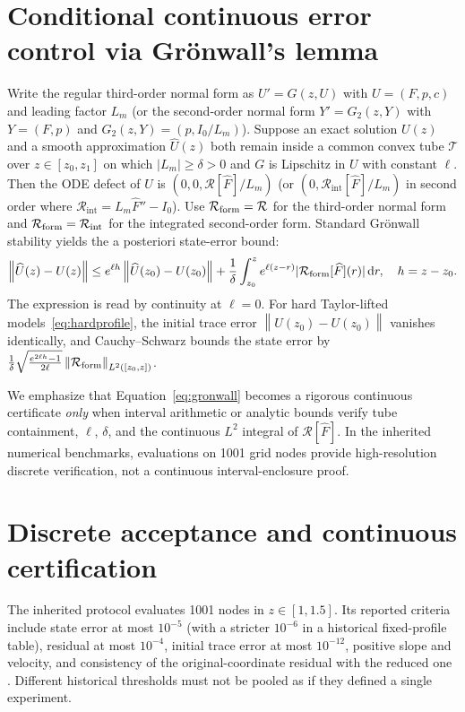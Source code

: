 \documentclass[11pt,a4paper,oneside]{report}
\numberwithin{equation}{chapter}
\newcommand{\R}{\mathcal R}
\newcommand{\dd}{\mathrm d}
\newcommand{\norm}[1]{\left\lVert#1\right\rVert}
\begin{document}
\section{Conditional continuous error control via Gr\"onwall's lemma}\label{sec:conditional-error}
Write the regular third-order normal form as $U'=G(z,U)$ with $U=(F,p,c)$ and leading factor $L_m$ (or the second-order normal form $Y'=G_2(z,Y)$ with $Y=(F,p)$ and $G_2(z,Y)=(p,I_0/L_m)$). Suppose an exact solution $U(z)$ and a smooth approximation $\widehat{U}(z)$ both remain inside a common convex tube $\mathcal{T}$ over $z\in[z_0,z_1]$ on which $|L_m|\ge \delta > 0$ and $G$ is Lipschitz in $U$ with constant $\ell$. Then the ODE defect of $\widehat{U}$ is $(0,0,\R[\widehat{F}]/L_m)$ (or $(0,\R_{\mathrm{int}}[\widehat{F}]/L_m)$ in second order where $\R_{\mathrm{int}}=L_m\widehat{F}''-I_0$). Use $\R_{\rm form}=\R$ for the third-order normal form and $\R_{\rm form}=\R_{\rm int}$ for the integrated second-order form. Standard Gr\"onwall stability \cite{teschl2012,mishra2023} yields the a posteriori state-error bound:
\begin{equation}\label{eq:gronwall}
\norm{\widehat U(z)-U(z)}\leq e^{\ell h}\norm{\widehat U(z_0)-U(z_0)}
 +\frac1\delta\int_{z_0}^{z}e^{\ell(z-r)}|\R_{\rm form}[\widehat F](r)|\,\dd r,
\quad h=z-z_0.
\end{equation}
The expression is read by continuity at $\ell=0$. For hard Taylor-lifted models~\eqref{eq:hardprofile}, the initial trace error $\norm{\widehat{U}(z_0)-U(z_0)}$ vanishes identically, and Cauchy--Schwarz bounds the state error by $\frac{1}{\delta}\sqrt{\frac{e^{2\ell h}-1}{2\ell}}\norm{\R_{\rm form}}_{L^2([z_0,z])}$.

We emphasize that Equation~\eqref{eq:gronwall} becomes a rigorous continuous certificate \emph{only} when interval arithmetic or analytic bounds verify tube containment, $\ell$, $\delta$, and the continuous $L^2$ integral of $\R[\widehat{F}]$. In the inherited numerical benchmarks, evaluations on 1001 grid nodes provide high-resolution discrete verification, not a continuous interval-enclosure proof.



\section{Discrete acceptance and continuous certification}
The inherited protocol evaluates 1001 nodes in $z\in[1,1.5]$. Its reported criteria include state error at most $10^{-5}$ (with a stricter $10^{-6}$ in a historical fixed-profile table), residual at most $10^{-4}$, initial trace error at most $10^{-12}$, positive slope and velocity, and consistency of the original-coordinate residual with the reduced one \cite{projectdraft}. Different historical thresholds must not be pooled as if they defined a single experiment.
\end{document}
